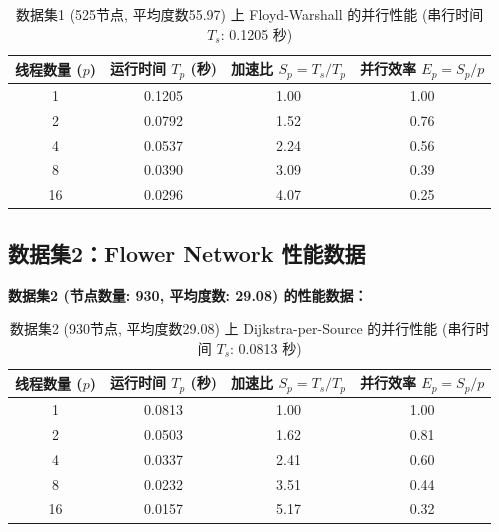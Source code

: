 \documentclass{SYSUReport}
\begin{document}
\begin{table}[H]
  \centering
  \caption{数据集1 (525节点, 平均度数55.97) 上 Floyd-Warshall 的并行性能 (串行时间 $T_s$: 0.1205 秒)}
  \label{tab:results_mouse_fw}
  \begin{tabular}{cccc}
    \toprule
    \textbf{线程数量 ($p$)} & \textbf{运行时间 $T_p$ (秒)} & \textbf{加速比 $S_p = T_s / T_p$} & \textbf{并行效率 $E_p = S_p / p$} \\
    \midrule
    1   & 0.1205 & 1.00 & 1.00 \\
    2   & 0.0792 & 1.52 & 0.76 \\
    4   & 0.0537 & 2.24 & 0.56 \\
    8   & 0.0390 & 3.09 & 0.39 \\
    16  & 0.0296 & 4.07 & 0.25 \\
    \bottomrule
  \end{tabular}
\end{table}

\subsection{数据集2：Flower Network 性能数据}

\textbf{数据集2 (节点数量: 930, 平均度数: 29.08) 的性能数据：}

\begin{table}[H]
  \centering
  \caption{数据集2 (930节点, 平均度数29.08) 上 Dijkstra-per-Source 的并行性能 (串行时间 $T_s$: 0.0813 秒)}
  \label{tab:results_flower_dijkstra}
  \begin{tabular}{cccc}
    \toprule
    \textbf{线程数量 ($p$)} & \textbf{运行时间 $T_p$ (秒)} & \textbf{加速比 $S_p = T_s / T_p$} & \textbf{并行效率 $E_p = S_p / p$} \\
    \midrule
    1   & 0.0813 & 1.00 & 1.00 \\
    2   & 0.0503 & 1.62 & 0.81 \\
    4   & 0.0337 & 2.41 & 0.60 \\
    8   & 0.0232 & 3.51 & 0.44 \\
    16  & 0.0157 & 5.17 & 0.32 \\
    \bottomrule
  \end{tabular}
\end{table}
\end{document}
